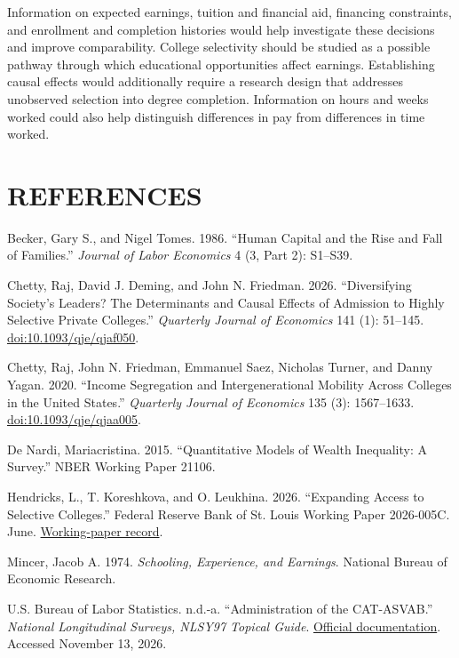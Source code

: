 \documentclass[12pt,letterpaper]{article}
\begin{document}
Information on expected earnings, tuition and financial aid, financing constraints, and
enrollment and completion histories would help investigate these decisions and improve
comparability. College selectivity should be studied as a possible pathway through which
educational opportunities affect earnings. Establishing causal effects would additionally 
require a research design that addresses unobserved selection into degree completion. 
Information on hours and weeks worked could also help distinguish differences in pay 
from differences in time worked.

\section*{REFERENCES}
\begin{list}{}{\setlength{\leftmargin}{0.3in}
              \setlength{\itemindent}{-0.3in}
              \setlength{\itemsep}{0.6\baselineskip}
              \setlength{\parsep}{0pt}}
\item Becker, Gary S., and Nigel Tomes. 1986. ``Human Capital and the Rise and Fall of Families.'' \textit{Journal of Labor Economics} 4 (3, Part 2): S1--S39.
\item Chetty, Raj, David J. Deming, and John N. Friedman. 2026. ``Diversifying Society's Leaders? The Determinants and Causal Effects of Admission to Highly Selective Private Colleges.'' \textit{Quarterly Journal of Economics} 141 (1): 51--145. \href{https://doi.org/10.1093/qje/qjaf050}{doi:10.1093/qje/qjaf050}.
\item Chetty, Raj, John N. Friedman, Emmanuel Saez, Nicholas Turner, and Danny Yagan. 2020. ``Income Segregation and Intergenerational Mobility Across Colleges in the United States.'' \textit{Quarterly Journal of Economics} 135 (3): 1567--1633. \href{https://doi.org/10.1093/qje/qjaa005}{doi:10.1093/qje/qjaa005}.
\item De Nardi, Mariacristina. 2015. ``Quantitative Models of Wealth Inequality: A Survey.'' NBER Working Paper 21106.
\item Hendricks, L., T. Koreshkova, and O. Leukhina. 2026. ``Expanding Access to Selective Colleges.'' Federal Reserve Bank of St. Louis Working Paper 2026-005C. June. \href{https://fedinprint.org/item/fedlwp/102965/103406}{Working-paper record}.
\item Mincer, Jacob A. 1974. \textit{Schooling, Experience, and Earnings}. National Bureau of Economic Research.
\item U.S. Bureau of Labor Statistics. n.d.-a. ``Administration of the CAT-ASVAB.'' \textit{National Longitudinal Surveys, NLSY97 Topical Guide}. \href{https://nlsinfo.org/content/cohorts/nlsy97/topical-guide/education/administration-cat-asvab-0}{Official documentation}. Accessed November 13, 2026.

\end{list}
\end{document}
